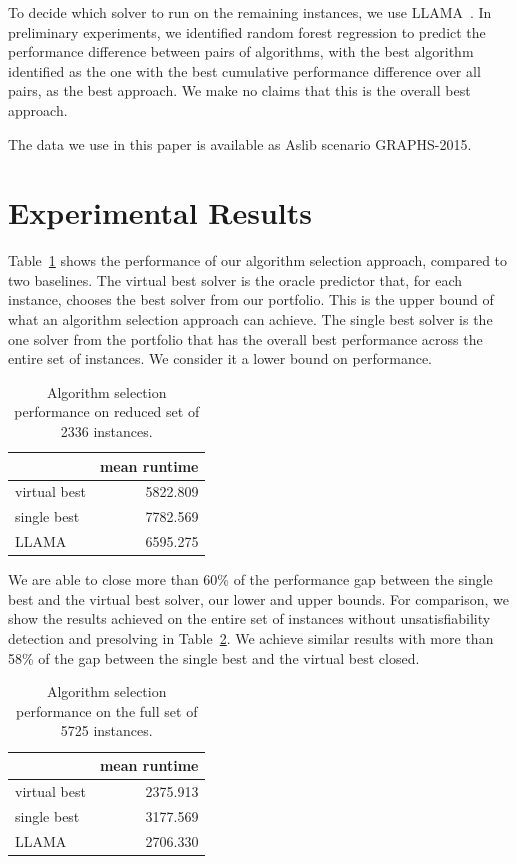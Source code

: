 \documentclass{llncs}
\begin{document}
To decide which solver to run on the remaining instances, we use LLAMA~\cite{kotthoff_llama_2013}.
In preliminary experiments, we identified random forest regression to predict the performance
difference between pairs of algorithms, with the best algorithm identified as the one with the best
cumulative performance difference over all pairs, as the best approach. We make no claims that this
is the overall best approach.

The data we use in this paper is available as Aslib scenario GRAPHS-2015.

\section{Experimental Results}

Table~\ref{tab:res} shows the performance of our algorithm selection approach, compared to two
baselines. The virtual best solver is the oracle predictor that, for each instance, chooses the best
solver from our portfolio. This is the upper bound of what an algorithm selection approach can
achieve. The single best solver is the one solver from the portfolio that has the overall best
performance across the entire set of instances. We consider it a lower bound on performance.

\begin{table}[ht]
\centering
\begin{tabular}{lr}
  \toprule
& mean runtime\\
  \midrule
virtual best & 5822.809\\
  single best & 7782.569\\
  LLAMA & 6595.275\\
   \bottomrule
\end{tabular}
\vspace{1ex}
\caption{Algorithm selection performance on reduced set of 2336
instances.}\label{tab:res}
\end{table}

We are able to close more than 60\% of the performance gap between the single
best and the virtual best solver, our lower and upper bounds. For comparison, we
show the results achieved on the entire set of instances without
unsatisfiability detection and presolving in Table~\ref{tab:resfull}. We achieve
similar results with more than 58\% of the gap between the single best and the
virtual best closed.

\begin{table}[ht]
\centering
\begin{tabular}{lr}
  \toprule
& mean runtime\\
  \midrule
virtual best & 2375.913\\
  single best & 3177.569\\
  LLAMA & 2706.330\\
   \bottomrule
\end{tabular}
\vspace{1ex}
\caption{Algorithm selection performance on the full set of 5725
instances.}\label{tab:resfull}
\end{table}
\end{document}
